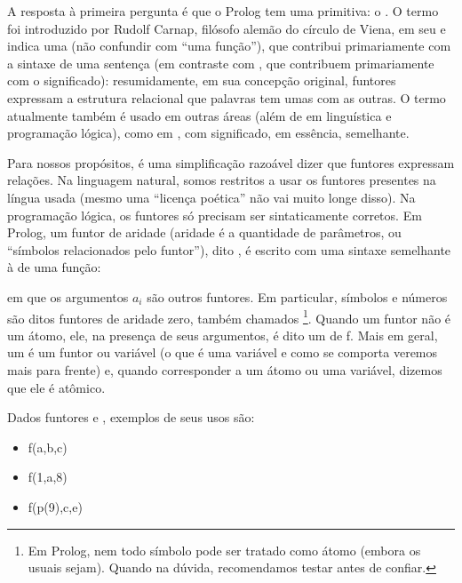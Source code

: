 A resposta à primeira pergunta é que o Prolog tem uma primitiva: o . O termo  foi introduzido por Rudolf Carnap, filósofo alemão do círculo de Viena, em seu \cite{carnap} e indica uma 
(não confundir com ``uma função''), que contribui primariamente com a sintaxe de uma sentença (em contraste com ,
que contribuem primariamente com o significado): resumidamente, em sua concepção original, funtores expressam a estrutura
relacional que palavras tem umas com as outras. O termo atualmente também é usado em outras áreas (além de em linguística e
programação lógica), como em , com significado, em essência, semelhante.

Para nossos propósitos, é uma simplificação razoável dizer que funtores expressam relações. Na linguagem natural, somos restritos a usar os funtores presentes na língua usada (mesmo uma ``licença poética'' não vai muito longe disso).
Na programação lógica, os funtores só precisam ser sintaticamente corretos. Em Prolog, um funtor
 de aridade  (aridade é a quantidade de parâmetros, ou ``símbolos relacionados pelo funtor''), dito
, é escrito com uma sintaxe semelhante à de uma função:


\noindent em que os argumentos $a_i$ são outros funtores. Em particular, símbolos e números são ditos funtores
de aridade zero, também chamados \footnote{Em Prolog, nem todo símbolo pode ser
  tratado como átomo (embora os usuais sejam). Quando na dúvida, recomendamos testar antes de
  confiar.}. Quando um funtor  não é um átomo, ele, na presença de seus argumentos,
é dito um  de  f. Mais em geral, um  é um funtor ou variável (o que é uma variável e como se comporta  veremos mais para frente) e, quando corresponder a um átomo ou uma variável, dizemos que ele é atômico.

Dados funtores  e , exemplos de seus usos são:

\begin{itemize}
  \item f(a,b,c)
  \item f(1,a,8)
  \item f(p(9),c,e)
\end{itemize}

